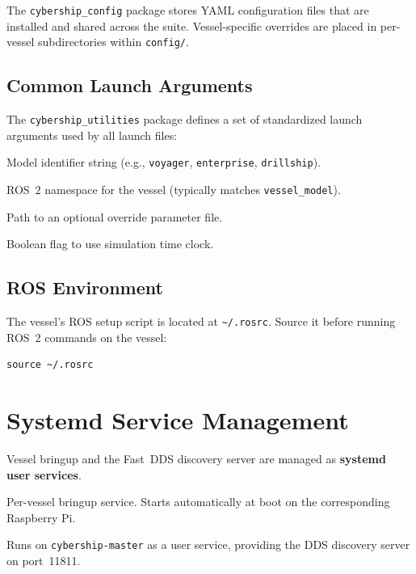 \documentclass[12pt,a4paper]{article}
\begin{document}
	The \texttt{cybership\_config} package stores YAML configuration files that are installed and
	shared across the suite. Vessel-specific overrides are placed in per-vessel subdirectories
	within \texttt{config/}.
	
	\subsection{Common Launch Arguments}
	
	The \texttt{cybership\_utilities} package defines a set of standardized launch arguments used
	by all launch files:
	
	\begin{description}[leftmargin=3.5cm]
		\item[\texttt{vessel\_model}] Model identifier string (e.g., \texttt{voyager},
		\texttt{enterprise}, \texttt{drillship}).
		\item[\texttt{vessel\_name}] ROS~2 namespace for the vessel (typically matches
		\texttt{vessel\_model}).
		\item[\texttt{param\_file}] Path to an optional override parameter file.
		\item[\texttt{use\_sim\_time}] Boolean flag to use simulation time clock.
	\end{description}
	
	\subsection{ROS Environment}
	
	The vessel's ROS setup script is located at \texttt{\textasciitilde/.rosrc}. Source it
	before running ROS~2 commands on the vessel:
	
	\begin{lstlisting}[style=bash]
		source ~/.rosrc
	\end{lstlisting}
	
	\section{Systemd Service Management}
	\label{sec:systemd}
	
	Vessel bringup and the Fast~DDS discovery server are managed as \textbf{systemd user services}.
	
	\begin{description}[leftmargin=5cm, style=nextline]
		\item[\texttt{ros2-cybership-<model>}] Per-vessel bringup service. Starts automatically at
		boot on the corresponding Raspberry Pi.
		\item[FastDDS service] Runs on \texttt{cybership-master} as a user service, providing the
		DDS discovery server on port~11811.
	\end{description}
	
\end{document}
